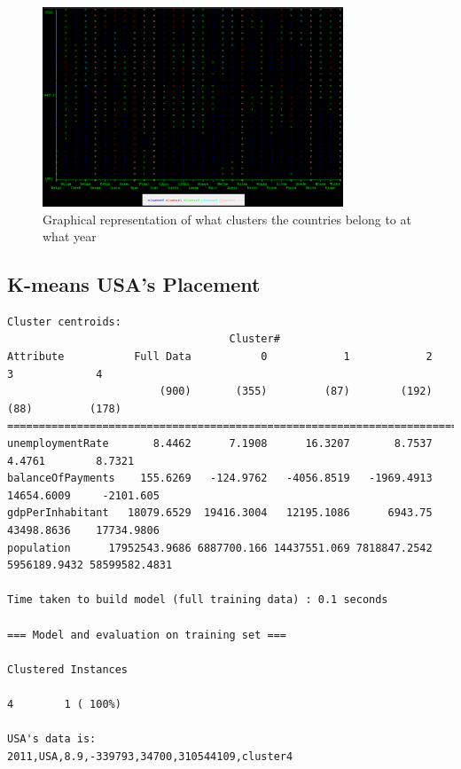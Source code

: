 \begin{figure}[h!]
  \centering
\includegraphics[angle=90,width=0.8\textwidth]{Appendix/Images/kMeans}
\caption{Graphical representation of what clusters the countries belong to at what year}
\label{fig:largeClusters}
\end{figure}

\pagebreak
\subsection{K-means USA's Placement}
\label{A_kmr_usa}
\begin{lstlisting}[basicstyle=\footnotesize\ttfamily,numbers=none]
Cluster centroids:
                                   Cluster#
Attribute           Full Data           0            1            2            3             4
                        (900)       (355)         (87)        (192)         (88)         (178)
=================================================================================================
unemploymentRate       8.4462      7.1908      16.3207       8.7537       4.4761        8.7321
balanceOfPayments    155.6269   -124.9762   -4056.8519   -1969.4913   14654.6009     -2101.605
gdpPerInhabitant   18079.6529  19416.3004   12195.1086      6943.75   43498.8636    17734.9806
population      17952543.9686 6887700.166 14437551.069 7818847.2542 5956189.9432 58599582.4831

Time taken to build model (full training data) : 0.1 seconds

=== Model and evaluation on training set ===

Clustered Instances

4        1 ( 100%)

USA's data is:
2011,USA,8.9,-339793,34700,310544109,cluster4
\end{lstlisting}

\pagebreak